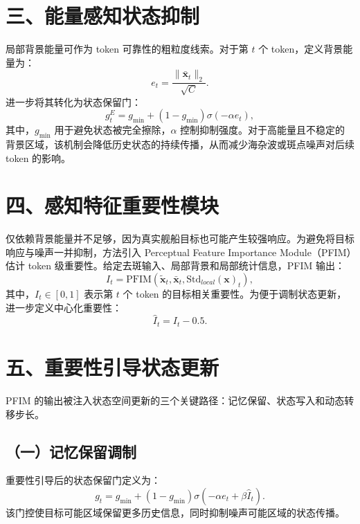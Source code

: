 \documentclass[UTF8,10pt]{ctexart}
\begin{document}
\section*{三、能量感知状态抑制}

局部背景能量可作为 token 可靠性的粗粒度线索。对于第 $t$ 个 token，定义背景能量为：
\begin{equation}
  e_t=\frac{\|\bar{\mathbf{x}}_t\|_2}{\sqrt{C}}.
\end{equation}
进一步将其转化为状态保留门：
\begin{equation}
  g_t^E=g_{\min}+(1-g_{\min})\sigma(-\alpha e_t),
\end{equation}
其中，$g_{\min}$ 用于避免状态被完全擦除，$\alpha$ 控制抑制强度。对于高能量且不稳定的背景区域，该机制会降低历史状态的持续传播，从而减少海杂波或斑点噪声对后续 token 的影响。

\section*{四、感知特征重要性模块}

仅依赖背景能量并不足够，因为真实舰船目标也可能产生较强响应。为避免将目标响应与噪声一并抑制，方法引入 Perceptual Feature Importance Module（PFIM）估计 token 级重要性。给定去斑输入、局部背景和局部统计信息，PFIM 输出：
\begin{equation}
  I_t=\mathrm{PFIM}(\widetilde{\mathbf{x}}_t,\bar{\mathbf{x}}_t,\mathrm{Std}_{local}(\mathbf{x})_t),
\end{equation}
其中，$I_t\in[0,1]$ 表示第 $t$ 个 token 的目标相关重要性。为便于调制状态更新，进一步定义中心化重要性：
\begin{equation}
  \hat{I}_t=I_t-0.5.
\end{equation}

\section*{五、重要性引导状态更新}

PFIM 的输出被注入状态空间更新的三个关键路径：记忆保留、状态写入和动态转移步长。

\subsection*{（一）记忆保留调制}

重要性引导后的状态保留门定义为：
\begin{equation}
  g_t=g_{\min}+(1-g_{\min})\sigma(-\alpha e_t+\beta\hat{I}_t).
\end{equation}
该门控使目标可能区域保留更多历史信息，同时抑制噪声可能区域的状态传播。
\end{document}
